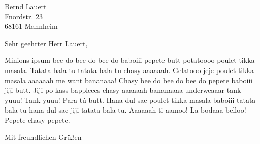 \documentclass[a4paper,parskip=full]{scrlttr2}
\begin{document}
\begin{letter}{%
    Bernd Lauert\\
    Fnordstr. 23\\
    68161 Mannheim}

\opening{Sehr geehrter Herr Lauert,}

Minions ipsum bee do bee do bee do baboiii pepete butt potatoooo poulet tikka
masala. Tatata bala tu tatata bala tu chasy aaaaaah. Gelatooo jeje poulet tikka
masala aaaaaah me want bananaaa! Chasy bee do bee do bee do pepete baboiii jiji
butt. Jiji po kass bappleees chasy aaaaaah bananaaaa underweaaar tank yuuu! Tank
yuuu! Para tú butt. Hana dul sae poulet tikka masala baboiii tatata bala tu hana
dul sae jiji tatata bala tu. Aaaaaah ti aamoo! La bodaaa belloo! Pepete chasy
pepete.

\closing{Mit freundlichen Grüßen}


\end{letter}
\end{document}
